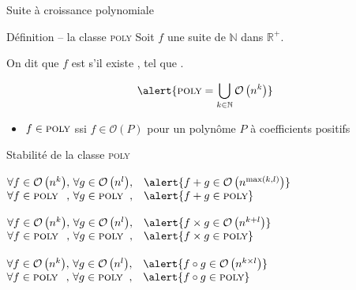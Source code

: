
\begingroup

\begin{frame}{Suite à croissance polynomiale}

  \begin{block}{Définition -- la classe \textsc{poly}}
    Soit $f$ une suite de $\mathbb{N}$ dans $\mathbb{R}^+$.

    On dit que $f$ est  s'il existe , tel que .

    $$\alert{\textsc{poly} = \bigcup_{k\in \mathbb{N}} \mathcal{O}\left(n^k\right)}$$

    \vspace{-1mm}
    \begin{itemize}
    \item $f\in \textsc{poly}$ ssi $f\in \mathcal{O}(P)$ pour un polynôme $P$ à coefficients positifs
    \end{itemize}
  \end{block}
  
  \begin{block}{Stabilité de la classe \textsc{poly}}
    \begin{description} 
    \item[Par somme :] 
      $\begin{array}[t]{@{}l@{,~}l@{,\quad}l@{}}
      \forall f \in \mathcal{O}\left(n^k\right) & \forall g \in \mathcal{O}\left(n^l\right) & \alert{f+g \in \mathcal{O}\left(n^{\max(k,l)}\right)}\\
      \forall f \in \textsc{poly}               & \forall g \in \textsc{poly}               & \alert{f+g \in \textsc{poly}}
    \end{array}$
    \item[Par produit :]\vspace{1mm}
      $\begin{array}[t]{@{}l@{,~}l@{,\quad}l@{}}
      \forall f \in \mathcal{O}\left(n^k\right) & \forall g \in \mathcal{O}\left(n^l\right) & \alert{f\times g \in \mathcal{O}\left(n^{k + l}\right)}\\
      \forall f \in \textsc{poly}               & \forall g \in \textsc{poly}               & \alert{f\times g \in \textsc{poly}}
    \end{array}$
    \item[Par composition :]\vspace{1mm}
      $\begin{array}[t]{@{}l@{,~}l@{,\quad}l@{}}
      \forall f \in \mathcal{O}\left(n^k\right) & \forall g \in \mathcal{O}\left(n^l\right) & \alert{f \circ g \in \mathcal{O}\left(n^{k \times l}\right)}\\
      \forall f \in \textsc{poly}               & \forall g \in \textsc{poly}               & \alert{f \circ g \in \textsc{poly}}
    \end{array}$
    \end{description}
  \end{block}

\end{frame}

\endgroup
\endinput
